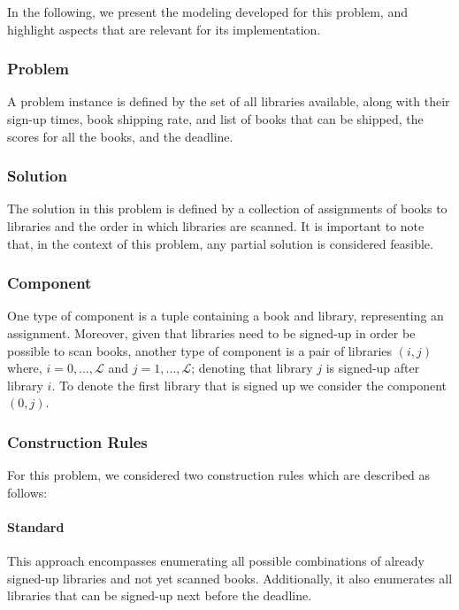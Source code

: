 In the following, we present the modeling developed for this problem, and
highlight aspects that are relevant for its implementation.

\subsubsection*{Problem}

A problem instance is defined by the set of all libraries available, along with
their sign-up times, book shipping rate, and list of books that can be shipped,
the scores for all the books, and the deadline.

\subsubsection*{Solution}
The solution in this problem is defined by a collection of assignments of books
to libraries and the order in which libraries are scanned. It is important to
note that, in the context of this problem, any partial solution is considered
feasible.

\subsubsection*{Component}

One type of component is a tuple containing a book and library, representing an
assignment. Moreover, given that libraries need to be signed-up in order be
possible to scan books, another type of component is a pair of libraries
$(i, j)$ where, $i = 0, \ldots, \mathcal{L}$ and $j = 1, \ldots, \mathcal{L}$;
denoting that library $j$ is signed-up after library $i$. To denote the first
library that is signed up we consider the component $(0, j)$.


\subsubsection*{Construction Rules}

For this problem, we considered two construction rules which are described as follows:

\paragraph*{Standard}

This approach encompasses enumerating all possible combinations of already
signed-up libraries and not yet scanned books. Additionally, it also enumerates
all libraries that can be signed-up next before the deadline.

